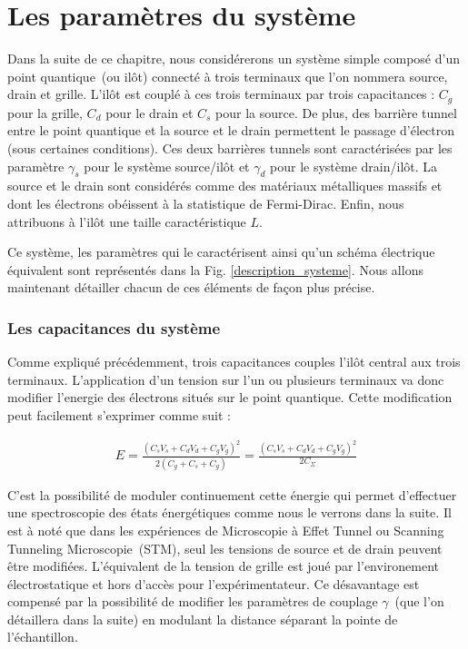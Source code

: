 \section{Les paramètres du système}
Dans la suite de ce chapitre, nous considérerons un système simple composé d'un point quantique~(ou ilôt) connecté à trois terminaux que l'on nommera source, drain et grille. L'il\^ot est couplé à ces trois terminaux par trois capacitances : $C_g$ pour la grille, $C_d$ pour le drain et $C_s$ pour la source. De plus, des barrière tunnel entre le point quantique et la source et le drain permettent le passage d'électron (sous certaines conditions). Ces deux barrières tunnels sont caractérisées par les paramètre $\gamma_s$ pour le système source/il\^ot et $\gamma_d$ pour le système drain/il\^ot. La source et le drain sont considérés comme des matériaux métalliques massifs et dont les électrons obéissent à la statistique de Fermi-Dirac. Enfin, nous attribuons à l'il\^ot une taille caractéristique $L$. 

Ce système, les paramètres qui le caractérisent ainsi qu'un schéma électrique équivalent sont représentés dans la Fig. \ref{description_systeme}. Nous allons maintenant détailler chacun de ces éléments de façon plus précise.


\subsubsection{Les capacitances du système}
Comme expliqué précédemment, trois capacitances couples l'il\^ot central aux trois terminaux. L'application d'un tension sur l'un ou plusieurs terminaux va donc modifier l'energie des électrons situés sur le point quantique. Cette modification peut facilement s'exprimer comme suit :

\begin{eqnarray}
E = \frac{(C_sV_s + C_dV_d + C_gV_g)^2}{2(C_g + C_s + C_g)}=\frac{(C_sV_s + C_dV_d + C_gV_g)^2}{2C_{\Sigma}} \nonumber
\end{eqnarray}

C'est la possibilité de moduler continuement cette énergie qui permet d'effectuer une spectroscopie des états énergétiques comme nous le verrons dans la suite. Il est à noté que dans les expériences de Microscopie à Effet Tunnel ou Scanning Tunneling Microscopie~(STM), seul les tensions de source et de drain peuvent \^etre modifiées. L'équivalent de la tension de grille est joué par l'environement électrostatique et hors d'accès pour l'expérimentateur. Ce désavantage est compensé par la possibilité de modifier les paramètres de couplage $\gamma$~(que l'on détaillera dans la suite) en modulant la distance séparant la pointe de l'échantillon.

